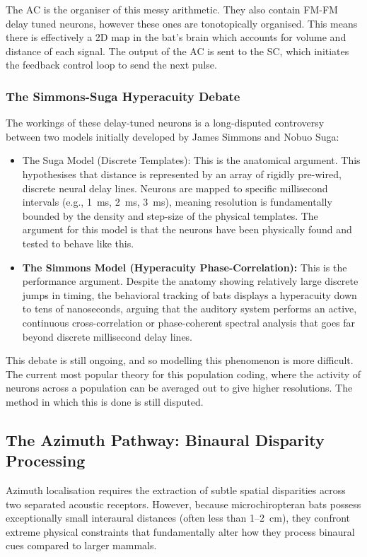The AC is the organiser of this messy arithmetic. They also contain FM-FM delay tuned neurons, however these ones are tonotopically organised. This means there is effectively a 2D map in the bat's brain which accounts for volume and distance of each signal. The output of the AC is sent to the SC, which initiates the feedback control loop to send the next pulse.

\subsubsection{The Simmons-Suga Hyperacuity Debate}
The workings of these delay-tuned neurons is a long-disputed controversy between two models initially developed by  James Simmons and Nobuo Suga:
\begin{itemize}
    \item {The Suga Model (Discrete Templates):} This is the anatomical argument. This hypothesises that distance is represented by an array of rigidly pre-wired, discrete neural delay lines. Neurons are mapped to specific millisecond intervals (e.g., 1~ms, 2~ms, 3~ms), meaning resolution is fundamentally bounded by the density and step-size of the physical templates. The argument for this model is that the neurons have been physically found and tested to behave like this.
    \item \textbf{The Simmons Model (Hyperacuity Phase-Correlation):} This is the performance argument. Despite the anatomy showing relatively large discrete jumps in timing, the behavioral tracking of bats displays a hyperacuity down to tens of nanoseconds, arguing that the auditory system performs an active, continuous cross-correlation or phase-coherent spectral analysis that goes far beyond discrete millisecond delay lines.
\end{itemize}
 This debate is still ongoing, and so modelling this phenomenon is more difficult. The current most popular theory for this population coding, where the activity of neurons across a population can be averaged out to give higher resolutions. The method in which this is done is still disputed.


\subsection{The Azimuth Pathway: Binaural Disparity Processing}
\label{sec:azimuth_pathway}
Azimuth localisation requires the extraction of subtle spatial disparities across two separated acoustic receptors. However, because microchiropteran bats possess exceptionally small interaural distances (often less than 1--2~cm), they confront extreme physical constraints that fundamentally alter how they process binaural cues compared to larger mammals.


